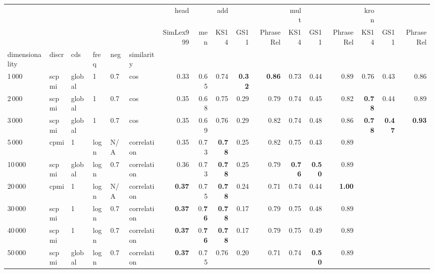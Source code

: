 \begin{tabular}{llllllrrrrrrrrrrr}
\toprule
      &      &   &   &     &             &      head &       &   add &       &           &  mult &       &           &  kron &       &           \\
      &      &   &   &     &             & SimLex999 &   men &  KS14 &  GS11 & PhraseRel &  KS14 &  GS11 & PhraseRel &  KS14 &  GS11 & PhraseRel \\
dimensionality & discr & cds & freq & neg & similarity &           &       &       &       &           &       &       &           &       &       &           \\
\midrule
1\,000  & scpmi & global & 1    & 0.7 & cos         &      0.33 &  0.65 &  0.74 &  \textbf{0.32} &      \textbf{0.86} &  0.73 &  0.44 &      0.89 &  0.76 &  0.43 &      0.86 \\
2\,000  & scpmi & global & 1    & 0.7 & cos         &      0.35 &  0.68 &  0.75 &  0.29 &      0.79 &  0.74 &  0.45 &      0.82 &  \textbf{0.78} &  0.44 &      0.89 \\
3\,000  & scpmi & global & 1    & 0.7 & cos         &      0.35 &  0.69 &  0.76 &  0.29 &      0.82 &  0.74 &  0.48 &      0.86 &  \textbf{0.78} &  \textbf{0.47} &      \textbf{0.93} \\
5\,000  & cpmi  & 1      & logn & N/A & correlation &      0.35 &  0.73 &  \textbf{0.78} &  0.25 &      0.82 &  0.75 &  0.43 &      0.89 &       &       &           \\
10\,000 & scpmi & global & logn & 0.7 & correlation &      0.36 &  0.73 &  \textbf{0.78} &  0.25 &      0.79 &  \textbf{0.76} &  \textbf{0.50} &      0.89 &       &       &           \\
20\,000 & cpmi  & 1      & logn & N/A & correlation &      \textbf{0.37} &  0.75 &  \textbf{0.78} &  0.24 &      0.71 &  0.74 &  0.44 &      \textbf{1.00} &       &       &           \\
30\,000 & scpmi & 1      & logn & 0.7 & correlation &      \textbf{0.37} &  0.\textbf{76} &  \textbf{0.78} &  0.17 &      0.79 &  0.75 &  0.48 &      0.89 &       &       &           \\
40\,000 & scpmi & 1      & logn & 0.7 & correlation &      \textbf{0.37} &  0.\textbf{76} &  \textbf{0.78} &  0.17 &      0.79 &  0.75 &  0.49 &      0.89 &       &       &           \\
50\,000 & scpmi & global & logn & 0.7 & correlation &      \textbf{0.37} &  0.75 &  0.76 &  0.20 &      0.71 &  0.74 &  \textbf{0.50} &      0.89 &       &       &           \\
\bottomrule
\end{tabular}
